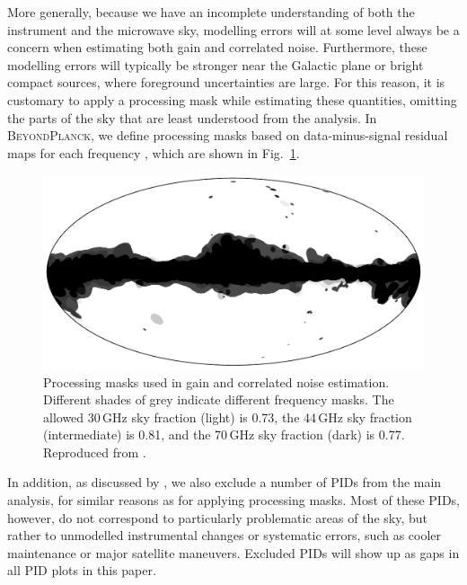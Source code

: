 \documentclass[twocolumn]{aa}
\newcommand{\BP}{\textsc{BeyondPlanck}}
\begin{document}
More generally, because we have an incomplete understanding of both
the instrument and the microwave sky, modelling errors will at some
level always be a concern when estimating both gain and correlated
noise. Furthermore, these modelling errors will typically be stronger
near the Galactic plane or bright compact sources, where foreground
uncertainties are large. For this reason, it is customary to apply a
processing mask while estimating these quantities, omitting the parts
of the sky that are least understood from the analysis. In \BP, we
define processing masks based on data-minus-signal residual maps for
each frequency \citep{bp06}, which are shown in
Fig.~\ref{fig:proc_mask}.

\begin{figure}[t]
  \center
    \includegraphics[width=\linewidth]{figs/mask_proc_BP8_v1.pdf}
    \caption{Processing masks used in gain and correlated noise estimation. Different shades of grey indicate different frequency masks. The allowed 30\,GHz sky fraction (light) is 0.73, the 44\,GHz sky fraction (intermediate) is 0.81, and the 70\,GHz sky fraction (dark) is 0.77. Reproduced from \citet{bp06}.}
  \label{fig:proc_mask}
\end{figure}
In addition, as discussed by \citet{bp10}, we also exclude a number of
PIDs from the main analysis, for similar reasons as for applying
processing masks. Most of these PIDs, however, do not correspond to
particularly problematic areas of the sky, but rather to unmodelled
instrumental changes or systematic errors, such as cooler maintenance or major
satellite maneuvers.  Excluded PIDs will show up as gaps in all PID plots in
this paper.
\end{document}
